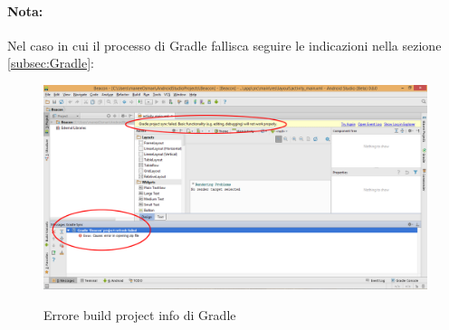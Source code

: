 \documentclass[../ManualeSviluppatore.tex]{subfiles}
\begin{document}
		\paragraph*{Nota:}
			Nel caso in cui il processo di Gradle fallisca seguire le indicazioni nella sezione \ref{subsec:Gradle}:
			
		\begin{figure} [h]
			\centering
			\includegraphics[width=\textwidth]{img/GradleError}
			\label{fig:GradleError}
			\caption{Errore build project info di Gradle}
		\end{figure}
		
\end{document}
